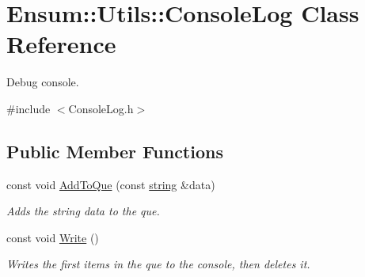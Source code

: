 \hypertarget{class_ensum_1_1_utils_1_1_console_log}{}\section{Ensum\+:\+:Utils\+:\+:Console\+Log Class Reference}
\label{class_ensum_1_1_utils_1_1_console_log}


Debug console.  




{\ttfamily \#include $<$Console\+Log.\+h$>$}

\subsection*{Public Member Functions}
\begin{DoxyCompactItemize}
\item 
const void \hyperlink{class_ensum_1_1_utils_1_1_console_log_af018fe2d5f702995ce18d4e2f2dde55c}{Add\+To\+Que} (const \hyperlink{class_ensum_1_1string}{string} \&data)\hypertarget{class_ensum_1_1_utils_1_1_console_log_af018fe2d5f702995ce18d4e2f2dde55c}{}\label{class_ensum_1_1_utils_1_1_console_log_af018fe2d5f702995ce18d4e2f2dde55c}

\begin{DoxyCompactList}\small\item\em Adds the string data to the que. \end{DoxyCompactList}\item 
const void \hyperlink{class_ensum_1_1_utils_1_1_console_log_a6d0cb31da153393c122cd5f9514eb6c9}{Write} ()
\begin{DoxyCompactList}\small\item\em Writes the first items in the que to the console, then deletes it. \end{DoxyCompactList}\end{DoxyCompactItemize}
